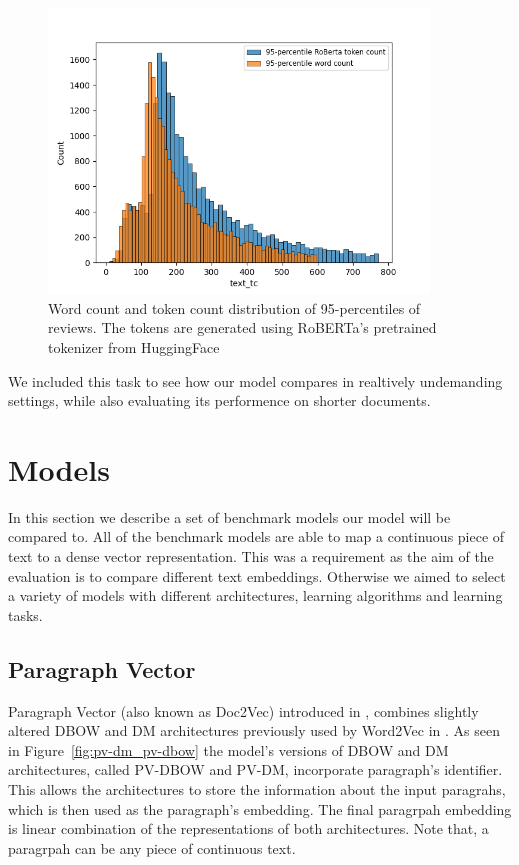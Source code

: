 \begin{figure}[ht]
  \centering
  \includegraphics[width=0.9\textwidth]{img/imdb_word_token_distributions.png}
  \caption{Word count and token count distribution of 95-percentiles of
  reviews. The tokens are generated using RoBERTa's pretrained tokenizer from
  HuggingFace}\label{fig:imdb_word_token_dist}
\end{figure}

We included this task to see how our model compares in realtively undemanding
settings, while also evaluating its performence on shorter documents.

\section{Models}

In this section we describe a set of benchmark models our model will be compared
to. All of the benchmark models are able to map a continuous piece of text to a
dense vector representation. This was a requirement as the aim of the evaluation
is to compare different text embeddings. Otherwise we aimed to select a variety
of models with different architectures, learning algorithms and learning tasks.

\subsection{Paragraph Vector}

Paragraph Vector (also known as Doc2Vec) introduced in \cite{le2014distributed},
combines slightly altered DBOW and DM architectures previously used by Word2Vec
in \cite{mikolov2013efficient}. As seen in Figure~\ref{fig:pv-dm_pv-dbow} the
model's versions of DBOW and DM architectures, called PV-DBOW and PV-DM,
incorporate paragraph's identifier. This allows the architectures to store the
information about the input paragrahs, which is then used as the paragraph's
embedding. The final paragrpah embedding is linear combination of the
representations of both architectures. Note that, a paragrpah can be any piece
of continuous text.

